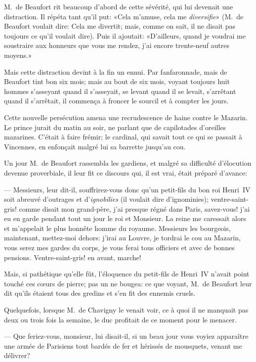 M.~de Beaufort rit beaucoup d'abord de cette sévérité, qui lui devenait une distraction. Il répéta tant qu'il put: «Cela m'amuse, cela me \textit{diversifie}» (M.~de Beaufort voulait dire: Cela me divertit; mais, comme on sait, il ne disait pas toujours ce qu'il voulait dire). Puis il ajoutait: «D'ailleurs, quand je voudrai me soustraire aux honneurs que vous me rendez, j'ai encore trente-neuf autres moyens.»

Mais cette distraction devint à la fin un ennui. Par fanfaronnade, mais de Beaufort tint bon six mois; mais au bout de six mois, voyant toujours huit hommes s'asseyant quand il s'asseyait, se levant quand il se levait, s'arrêtant quand il s'arrêtait, il commença à froncer le sourcil et à compter les jours.

Cette nouvelle persécution amena une recrudescence de haine contre le Mazarin. Le prince jurait du matin au soir, ne parlant que de capilotades d'oreilles mazarines. C'était à faire frémir; le cardinal, qui savait tout ce qui se passait à Vincennes, en enfonçait malgré lui sa barrette jusqu'au cou.

Un jour M.~de Beaufort rassembla les gardiens, et malgré sa difficulté d'élocution devenue proverbiale, il leur fit ce discours qui, il est vrai, était préparé d'avance:

— Messieurs, leur dit-il, souffrirez-vous donc qu'un petit-fils du bon roi Henri~IV soit abreuvé d'outrages et d'\textit{ignobilies} (il voulait dire d'ignominies); ventre-saint-gris! comme disait mon grand-père, j'ai presque régné dans Paris, savez-vous! j'ai eu en garde pendant tout un jour le roi et Monsieur. La reine me caressait alors et m'appelait le plus honnête homme du royaume. Messieurs les bourgeois, maintenant, mettez-moi dehors: j'irai au Louvre, je tordrai le cou au Mazarin, vous serez mes gardes du corps, je vous ferai tous officiers et avec de bonnes pensions. Ventre-saint-gris! en avant, marche!

Mais, si pathétique qu'elle fût, l'éloquence du petit-fils de Henri~IV n'avait point touché ces cœurs de pierre; pas un ne bougea: ce que voyant, M.~de Beaufort leur dit qu'ils étaient tous des gredins et s'en fit des ennemis cruels.

Quelquefois, lorsque M.~de Chavigny le venait voir, ce à quoi il ne manquait pas deux ou trois fois la semaine, le duc profitait de ce moment pour le menacer.

— Que feriez-vous, monsieur, lui disait-il, si un beau jour vous voyiez apparaître une armée de Parisiens tout bardés de fer et hérissés de mousquets, venant me délivrer?

